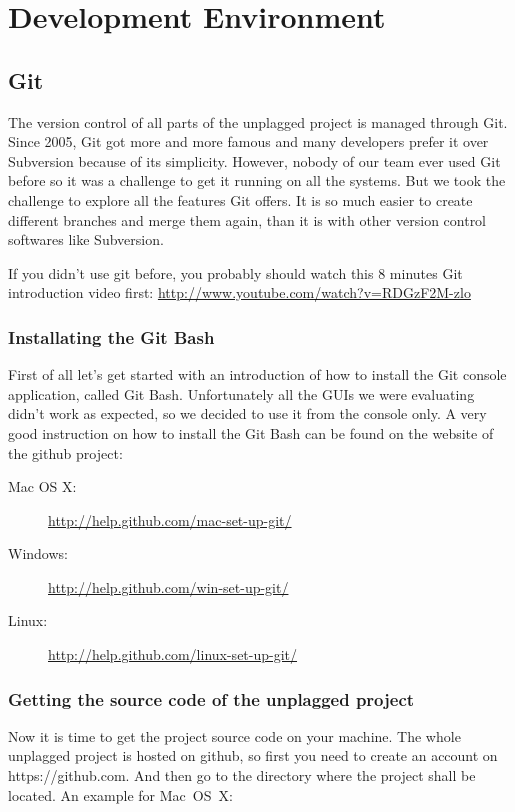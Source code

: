 \section{Development Environment}

\subsection{Git}
The version control of all parts of the unplagged project is managed through Git. Since 2005, Git got more and more 
famous and many developers prefer it over Subversion because of its simplicity. However, nobody of our team ever used 
Git before so it was a challenge to get it running on all the systems. But we took the challenge to explore all the 
features Git offers. It is so much easier to create different branches and merge them again, than it is with other 
version control softwares like Subversion.

If you didn't use git before, you probably should watch this 8 minutes Git introduction video first:
\url{http://www.youtube.com/watch?v=RDGzF2M-zlo}

\subsubsection{Installating the Git Bash}
First of all let's get started with an introduction of how to install the Git console application, called Git Bash. 
Unfortunately all the GUIs we were evaluating didn't work as expected, so we decided to use it from the console only. 
A very good instruction on how to install the Git Bash can be found on the website of the github project:

\begin{description}
\item[Mac OS X:] \url{http://help.github.com/mac-set-up-git/}
\item[Windows:] \url{http://help.github.com/win-set-up-git/}
\item[Linux:] \url{http://help.github.com/linux-set-up-git/}
\end{description}

\subsubsection{Getting the source code of the unplagged project}
Now it is time to get the project source code on your machine. The whole unplagged project is hosted on github, so 
first you need to create an account on https://github.com. And then go to the directory where the project shall be 
located. An example for Mac~OS~X:

